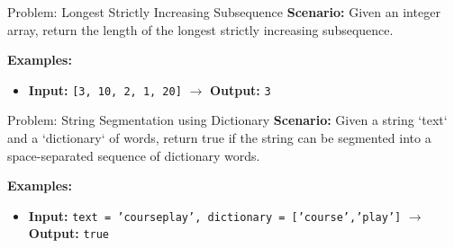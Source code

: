 \begin{frame}[fragile]{Problem: Longest Strictly Increasing Subsequence}
  \textbf{Scenario:}
  Given an integer array, return the length of the longest strictly increasing subsequence.
  
  \vspace{0.3cm}
  \textbf{Examples:}
  \begin{itemize}
    \item \textbf{Input:} \texttt{[3, 10, 2, 1, 20]} $\rightarrow$ \textbf{Output:} \texttt{3}
  \end{itemize}
\end{frame}

\begin{frame}[fragile]{Problem: String Segmentation using Dictionary}
  \textbf{Scenario:}
  Given a string `text` and a `dictionary` of words, return true if the string can be segmented into a space-separated sequence of dictionary words.
  
  \vspace{0.3cm}
  \textbf{Examples:}
  \begin{itemize}
    \item \textbf{Input:} \texttt{text = 'courseplay', dictionary = ['course','play']} $\rightarrow$ \textbf{Output:} \texttt{true}
  \end{itemize}
\end{frame}
